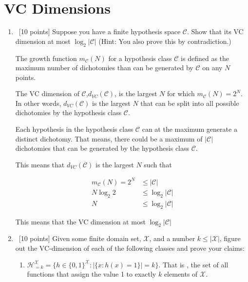 \section{VC Dimensions}
\label{sec:vc-dimension}
\begin{enumerate}
\item ~[10 points] Suppose you have a finite hypothesis space
  $\mathcal{C}$. Show that its VC dimension at most
  $\log_2|\mathcal{C}|$ (Hint: You also prove this by contradiction.)

The growth function $m_\mathcal{C}(N)$ for a hypothesis class $\mathcal{C}$ is defined as the maximum number of dichotomies than can be generated by $\mathcal{C}$ on any $N$ points. 

The VC dimension of $\mathcal{C}$,$d_{VC}(\mathcal{C})$, is the largest $N$ for which $m_\mathcal{C}(N)=2^N$. In other words, $d_{VC}(\mathcal{C})$ is the largest $N$ that can be split into all possible dichotomies by the hypothesis class $\mathcal{C}$.

Each hypothesis in the hypothesis class $\mathcal{C}$ can at the maximum generate a distinct dichotomy. That means, there could be a maximum of $\left | \mathcal{C} \right| $ dichotomies that can be generated by the hypothesis class $\mathcal{C}$.

This means that $d_{VC}(\mathcal{C})$ is the largest $N$ such that 

\begin{equation*}
\begin{aligned}
m_\mathcal{C}(N)=2^N &\leq \left | \mathcal{C} \right| \\
N \log_2 2 &\leq \log_2 \left | \mathcal{C} \right| \\
N &\leq \log_2|\mathcal{C}|
\end{aligned}
\end{equation*}

This means that the VC dimension at most $\log_2|\mathcal{C}|$

\item ~[10 points] Given some finite domain set, $\mathcal{X}$, and a
  number $k \leq |\mathcal{X}|$, figure out the VC-dimension of each
  of the following classes and prove your claims:

  \begin{enumerate}
  \item
    $\mathcal{H}_{=k}^{\mathcal{X}} = \{h \in \{0,1\}^\mathcal{X} :
    |\{x : h(x) = 1\} | = k \}$. That is , the set of all functions that
    assign the value 1 to exactly $k$ elements of $\mathcal{X}$.\\


\end{enumerate}
\end{enumerate}
